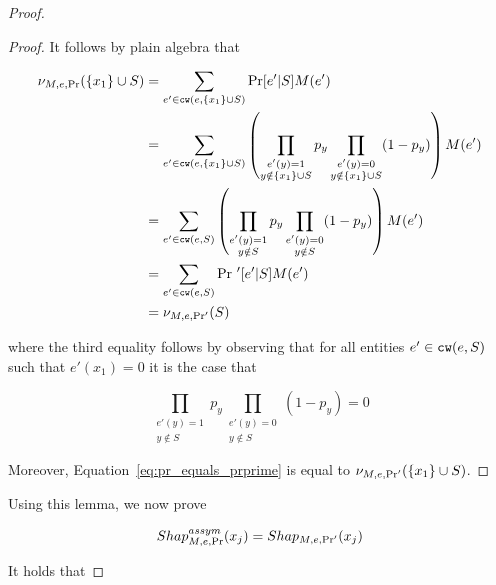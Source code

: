 \begin{proof}
\begin{lemma}
    \end{lemma}

    \begin{proof}
        It follows by plain algebra that
    
        \begin{align}
            \nu_{M,e,\Pr}(\{x_1\} \cup S) &= \sum_{e' \in \texttt{cw}(e,\{x_1\} \cup S)} \Pr[e' | S] M(e') \nonumber \\
            &= \sum_{e' \in \texttt{cw}(e, \{x_1\} \cup S)} \left( \prod_{\substack{e'(y) = 1 \\ y \notin \{x_1\} \cup S}} p_y \prod_{\substack{e'(y) = 0 \\ y \notin \{x_1\} \cup S}} (1-p_y)\right) M(e')\\
            &= \sum_{e' \in \texttt{cw}(e, S)} \left( \prod_{\substack{e'(y) = 1 \\ y \notin S}} p_y \prod_{\substack{e'(y) = 0 \\ y \notin S}} (1-p_y)\right) M(e') \nonumber\\
            &= \sum_{e' \in \texttt{cw}(e, S)} \Pr\,'[e' | S] M(e') \nonumber\\
            &= \nu_{M,e,\Pr'}(S) \nonumber
        \end{align}

        where the third equality follows by observing that for all entities $e' \in \texttt{cw}(e, S)$ such that $e'(x_1) = 0$ it is the case that 
        
        $$\prod_{\substack{e'(y) = 1 \\ y \notin S}} p_y \prod_{\substack{e'(y) = 0 \\ y \notin S}} (1-p_y) = 0$$

        Moreover, Equation~\ref{eq:pr_equals_prprime} is equal to $\nu_{M,e,\Pr'}(\{x_1\} \cup S)$.
    \end{proof}

    Using this lemma, we now prove

    \begin{align}\label{eq:relation_between_assym_and_shap_naive_child}
        Shap^{assym}_{M,e,\Pr} (x_j) = Shap_{M,e,\Pr'}(x_j)
    \end{align}

    It holds that


\end{proof}
